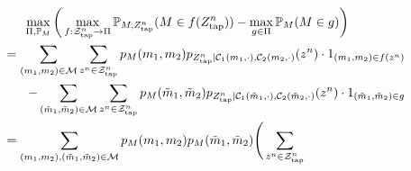 \documentclass[journal]{IEEEtran}
\newcommand{\codebookpmf}{p}
\newcommand{\channelOut}{Z}
\newcommand{\channelOutAlph}{\mathcal{Z}}
\newcommand{\channelOutAlphElement}{z}
\newcommand{\channelOutAlphWiretapper}{\channelOutAlph_\mathrm{tap}}
\newcommand{\channelOutAlphElementWiretapper}{\channelOutAlphElement}
\newcommand{\channelOutWiretapper}{\channelOut_\mathrm{tap}}
\newcommand{\codebookOne}{\mathcal{C}_1}
\newcommand{\codebookTwo}{\mathcal{C}_2}
\newcommand{\codebookBlocklength}{n}
\newcommand{\Probability}{\mathbb{P}}
\newcommand{\indicator}[1]{1_{#1}}
\newcommand{\messageRV}{M}
\newcommand{\messageAlphabet}{\mathcal{M}}
\newcommand{\messageAlphabetElement}{m}
\newcommand{\partition}{{\Pi}}
\newcommand{\wiretapperDecoder}{{f}}
\newcommand{\wiretapperGuesser}{{g}}
\begin{document}
\begin{align}
\label{distinguishing-implies-semantic-begin}
&\hphantom{{}={}}
\max\limits_{\partition, \Probability_\messageRV} \bigg(
  \max\limits_{\wiretapperDecoder: \channelOutAlphWiretapper^\codebookBlocklength \rightarrow \partition}
  \Probability_{\messageRV, \channelOutWiretapper^\codebookBlocklength}(\messageRV \in \wiretapperDecoder(\channelOutWiretapper^\codebookBlocklength))
  -
  \max\limits_{\wiretapperGuesser \in \partition}
  \Probability_{\messageRV}(\messageRV \in \wiretapperGuesser)
\bigg)
\\
&
\begin{aligned}
=
\sum\limits_{(\messageAlphabetElement_1, \messageAlphabetElement_2) \in \messageAlphabet}
\sum\limits_{\channelOutAlphElementWiretapper^\codebookBlocklength \in \channelOutAlphWiretapper^\codebookBlocklength}
  \codebookpmf_\messageRV(\messageAlphabetElement_1, \messageAlphabetElement_2)
  \codebookpmf_{\channelOutWiretapper^\codebookBlocklength | \codebookOne(\messageAlphabetElement_1, \cdot), \codebookTwo(\messageAlphabetElement_2, \cdot)}(\channelOutAlphElementWiretapper^\codebookBlocklength)
  \cdot
  \indicator{(\messageAlphabetElement_1,\messageAlphabetElement_2) \in \wiretapperDecoder(\channelOutAlphElementWiretapper^\codebookBlocklength)}
\\
-
\sum\limits_{(\tilde{\messageAlphabetElement}_1, \tilde{\messageAlphabetElement}_2) \in \messageAlphabet}
\sum\limits_{\channelOutAlphElementWiretapper^\codebookBlocklength \in \channelOutAlphWiretapper^\codebookBlocklength}
  \codebookpmf_\messageRV(\tilde{\messageAlphabetElement}_1, \tilde{\messageAlphabetElement}_2)
  \codebookpmf_{\channelOutWiretapper^\codebookBlocklength | \codebookOne(\tilde{\messageAlphabetElement}_1, \cdot), \codebookTwo(\tilde{\messageAlphabetElement}_2, \cdot)}(\channelOutAlphElementWiretapper^\codebookBlocklength)
  \cdot
  \indicator{(\tilde{\messageAlphabetElement}_1,\tilde{\messageAlphabetElement}_2) \in \wiretapperGuesser}
\end{aligned}
\\
&
\begin{aligned}
=
\sum\limits_{(\messageAlphabetElement_1, \messageAlphabetElement_2), (\tilde{\messageAlphabetElement}_1, \tilde{\messageAlphabetElement}_2) \in \messageAlphabet}
\codebookpmf_\messageRV(\messageAlphabetElement_1, \messageAlphabetElement_2)
\codebookpmf_\messageRV(\tilde{\messageAlphabetElement}_1, \tilde{\messageAlphabetElement}_2)
\Bigg(
\sum\limits_{\channelOutAlphElementWiretapper^\codebookBlocklength \in \channelOutAlphWiretapper^\codebookBlocklength}

\end{aligned}
\end{align}
\end{document}

